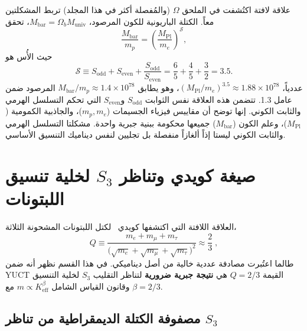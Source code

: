 \documentclass[12pt,a4paper]{article}
\begin{document}
	علاقة لافتة اكتُشفت في الملحق \(\Omega\) (والمُفصلة أكثر في هذا المجلد) تربط المشكلتين معاً. الكتلة الباريونية للكون المرصود، \(M_{\mathrm{bar}} = \Omega_b M_{\mathrm{univ}}\)، تحقق
	\begin{equation}
		\frac{M_{\mathrm{bar}}}{m_p} = \left( \frac{M_{\mathrm{Pl}}}{m_e} \right)^{\mathcal{S}},
		\label{eq:baryon-hierarchy}
	\end{equation}
	حيث الأُس هو
	\begin{equation}
		\mathcal{S} \equiv S_{\mathrm{odd}} + S_{\mathrm{even}} + \frac{S_{\mathrm{odd}}}{S_{\mathrm{even}}} = \frac{6}{5} + \frac{4}{5} + \frac{3}{2} = 3.5.
	\end{equation}
	عددياً، \((M_{\mathrm{Pl}}/m_e)^{3.5} \approx 1.88 \times 10^{78}\)، وهو يطابق \(M_{\mathrm{bar}}/m_p \approx 1.4 \times 10^{78}\) المرصود ضمن عامل 1.3. تتضمن هذه العلاقة نفس الثوابت \(S_{\mathrm{odd}}\) و\(S_{\mathrm{even}}\) التي تحكم التسلسل الهرمي والثابت الكوني. إنها توضح أن مقاييس فيزياء الجسيمات (\(m_p, m_e\))، والجاذبية الكمومية (\(M_{\mathrm{Pl}}\))، وعلم الكون (\(M_{\mathrm{bar}}\)) جميعها محكومة ببنية جبرية واحدة. مشكلتا التسلسل الهرمي والثابت الكوني ليستا إذاً ألغازاً منفصلة بل تجليين لنفس ديناميك التنسيق الأساسي.
	
	\section{صيغة كويدي وتناظر \(S_3\) لخلية تنسيق اللبتونات}
	\label{sec:koide}
	
	العلاقة اللافتة التي اكتشفها كويدي~\cite{Koide1983} لكتل اللبتونات المشحونة الثلاثة،
	\begin{equation}
		Q \equiv \frac{m_e + m_\mu + m_\tau}{\bigl(\sqrt{m_e} + \sqrt{m_\mu} + \sqrt{m_\tau}\bigr)^2}
		\approx \frac{2}{3}\;,
	\end{equation}
	طالما اعتُبرت مصادفة عددية خالية من أصل ديناميكي. في هذا القسم نظهر أنه ضمن YUCT القيمة \(Q=2/3\) هي \textbf{نتيجة جبرية ضرورية} لتناظر التقليب \(S_3\) لخلية التنسيق وقانون القياس الشامل \(m \propto K_{\mathrm{eff}}^{\beta}\) مع \(\beta=2/3\).
	
	\subsection{مصفوفة الكتلة الديمقراطية من تناظر \(S_3\)}
	
\end{document}
